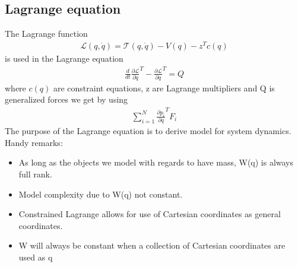 \subsection{Lagrange equation}
The Lagrange function
\begin{align}
    \mathcal{L}(q,\Dot{q})=\mathcal{T}(q,\Dot{q})-V(q)-z^Tc(q)
\end{align}
is used in the Lagrange equation
\begin{align}
    \frac{d}{dt}\frac{\partial\mathcal{L}}{\partial \dot{q}}^T-\frac{\partial\mathcal{L}}{\partial q}^T=Q
\end{align}
where $c(q)$ are constraint equations, z are Lagrange multipliers and Q is generalized forces we get by using 
\begin{align}
    \sum_{i=1}^N\frac{\partial p_i}{\partial q}^T F_i
\end{align}
The purpose of the Lagrange equation is to derive model for system dynamics. Handy remarks:
\begin{itemize}
    \item As long as the objects we model with regards to have mass, W(q) is always full rank.
    \item Model complexity due to W(q) not constant.
    \item Constrained Lagrange allows for use of Cartesian coordinates as general coordinates.
    \item W will always be constant when a collection of Cartesian coordinates are used as q
\end{itemize}




